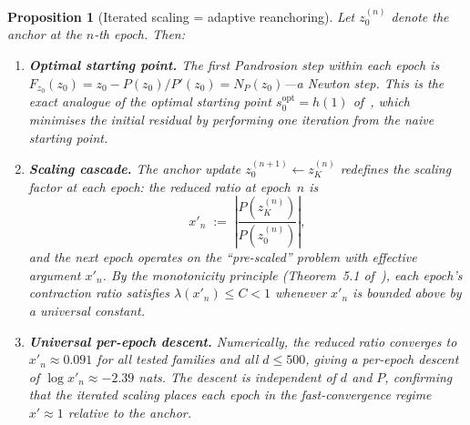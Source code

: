 \documentclass[10pt,a4paper,oneside]{book}
\newtheorem{proposition}[theorem]{Proposition}
\theoremstyle{definition}
\theoremstyle{remark}
\begin{document}
\begin{proposition}[Iterated scaling = adaptive reanchoring]
\label{prop:iterated_scaling}
Let $z_0^{(n)}$ denote the anchor at the $n$-th epoch.  Then:
\begin{enumerate}
  \item[\textup{(i)}] \textbf{Optimal starting point.}  The first Pandrosion step within each epoch is $F_{z_0}(z_0) = z_0 - P(z_0)/P'(z_0) = N_P(z_0)$---a Newton step.  This is the exact analogue of the optimal starting point $s_0^{\mathrm{opt}} = h(1)$ of~\cite{besevic2026}, which minimises the initial residual by performing one iteration from the naive starting point.
  \item[\textup{(ii)}] \textbf{Scaling cascade.}  The anchor update $z_0^{(n+1)} \leftarrow z_K^{(n)}$ redefines the scaling factor at each epoch: the reduced ratio at epoch~$n$ is
  \begin{equation}
    \label{eq:reduced_ratio}
    x'_n \;:=\; \left|\frac{P(z_K^{(n)})}{P(z_0^{(n)})}\right|,
  \end{equation}
  and the next epoch operates on the ``pre-scaled'' problem with effective argument $x'_n$.  By the monotonicity principle (Theorem~5.1 of~\cite{besevic2026}), each epoch's contraction ratio satisfies $\lambda(x'_n) \leq C < 1$ whenever $x'_n$ is bounded above by a universal constant.
  \item[\textup{(iii)}] \textbf{Universal per-epoch descent.}  Numerically, the reduced ratio converges to $x'_n \approx 0.091$ for all tested families and all $d \leq 500$, giving a per-epoch descent of $\log x'_n \approx -2.39$ nats.  The descent is independent of $d$ and $P$, confirming that the iterated scaling places each epoch in the fast-convergence regime $x' \approx 1$ relative to the anchor.
\end{enumerate}
\end{proposition}
\end{document}
